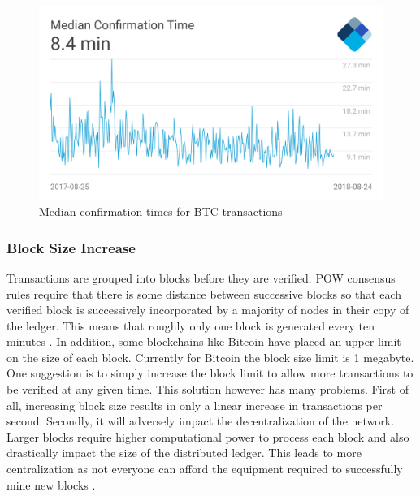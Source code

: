 \begin{figure}[h]
	\centering
    \includegraphics[width=120mm,scale=1]{figs/median-confirmation-time}
	\caption{Median confirmation times for BTC transactions \cite{fig:001}}
	\label{fig:mct}
\end{figure}
\vspace{0.5cm}  
\subsubsection{Block Size Increase} \label{BSI} 
Transactions are grouped into blocks before they are verified. POW consensus rules require that there is some distance between successive blocks so that each verified block is successively incorporated by a majority of nodes in their copy of the ledger. This means that roughly only one block is generated every ten minutes \cite{paper:001}. In addition, some blockchains like Bitcoin have placed an upper limit on the size of each block. Currently for Bitcoin the block size limit is 1 megabyte. One suggestion is to simply increase the block limit to allow more transactions to be verified at any given time.  This solution however has many problems. First of all, increasing block size results in only a linear increase in transactions per second. Secondly, it will adversely impact the decentralization of the network. Larger blocks require higher computational power to process each block and also drastically impact the size of the distributed ledger. This leads to more centralization as not everyone can afford the equipment required to successfully mine new blocks \cite{medium:006}.  
\vspace{0.5cm}  
